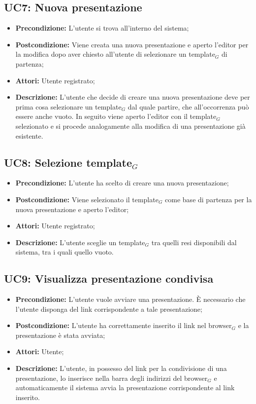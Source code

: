\subsection{ UC7: Nuova presentazione}

\begin{itemize}
	\item \textbf{Precondizione:} L’utente si trova all’interno del sistema;
	\item \textbf{Postcondizione:} Viene creata una nuova presentazione e aperto l’editor per la modifica dopo aver chiesto all’utente di selezionare un template$_G$ di partenza;
	\item \textbf{Attori:} Utente registrato;
	\item \textbf{Descrizione:} L’utente che decide di creare una nuova presentazione deve per prima cosa selezionare un template$_G$ dal quale partire, che all’occorrenza può essere anche vuoto. In seguito viene aperto l’editor con il template$_G$ selezionato e si procede analogamente alla modifica di una presentazione già esistente.
\end{itemize}
\subsection{ UC8: Selezione template$_G$}

\begin{itemize}
	\item \textbf{Precondizione:} L’utente ha scelto di creare una nuova presentazione;
	\item \textbf{Postcondizione:} Viene selezionato il template$_G$ come base di partenza per la nuova presentazione e aperto l’editor;
	\item \textbf{Attori:} Utente registrato;
	\item \textbf{Descrizione:} L’utente sceglie un template$_G$ tra quelli resi disponibili dal sistema, tra i quali quello vuoto.
\end{itemize}
\subsection{ UC9: Visualizza presentazione condivisa}

\begin{itemize}
	\item \textbf{Precondizione:} L’utente vuole avviare una presentazione. È necessario che l’utente disponga del link corrispondente a tale presentazione;
	\item \textbf{Postcondizione:} L’utente ha correttamente inserito il link nel browser$_G$ e la presentazione è stata avviata;
	\item \textbf{Attori:} Utente;
	\item \textbf{Descrizione:} L’utente, in possesso del link per la condivisione di una presentazione, lo inserisce nella barra degli indirizzi del browser$_G$ e automaticamente il sistema avvia la presentazione corrispondente al link inserito.
\end{itemize}